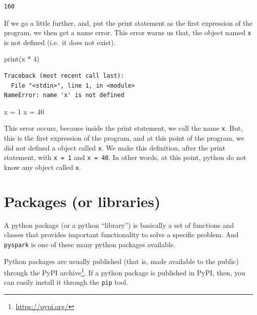 \documentclass[
  11pt,
  letterpaper,
  DIV=11,
  numbers=noendperiod]{scrreprt}
\newenvironment{Shaded}{\begin{snugshade}}{\end{snugshade}}
\newcommand{\BuiltInTok}[1]{\textcolor[rgb]{0.00,0.23,0.31}{#1}}
\newcommand{\DecValTok}[1]{\textcolor[rgb]{0.68,0.00,0.00}{#1}}
\newcommand{\NormalTok}[1]{\textcolor[rgb]{0.00,0.23,0.31}{#1}}
\newcommand{\OperatorTok}[1]{\textcolor[rgb]{0.37,0.37,0.37}{#1}}
\begin{document}
\begin{verbatim}
160
\end{verbatim}

If we go a little further, and, put the print statement as the first
expression of the program, we then get a name error. This error warns us
that, the object named \texttt{x} is not defined (i.e.~it does not
exist).

\begin{Shaded}
\begin{Highlighting}[]
\BuiltInTok{print}\NormalTok{(x }\OperatorTok{*} \DecValTok{4}\NormalTok{)}
\end{Highlighting}
\end{Shaded}

\begin{verbatim}
Traceback (most recent call last):
  File "<stdin>", line 1, in <module>
NameError: name 'x' is not defined
\end{verbatim}

\begin{Shaded}
\begin{Highlighting}[]
\NormalTok{x }\OperatorTok{=} \DecValTok{1}
\NormalTok{x }\OperatorTok{=} \DecValTok{40}
\end{Highlighting}
\end{Shaded}

This error occurs, because inside the print statement, we call the name
\texttt{x}. But, this is the first expression of the program, and at
this point of the program, we did not defined a object called
\texttt{x}. We make this definition, after the print statement, with
\texttt{x\ =\ 1} and \texttt{x\ =\ 40}. In other words, at this point,
python do not know any object called \texttt{x}.

\hypertarget{packages-or-libraries}{%
\section{Packages (or libraries)}\label{packages-or-libraries}}

A python package (or a python ``library'') is basically a set of
functions and classes that provides important functionality to solve a
specific problem. And \texttt{pyspark} is one of these many python
packages available.

Python packages are usually published (that is, made available to the
public) through the PyPI archive\footnote{\url{https://pypi.org/}}. If a
python package is published in PyPI, then, you can easily install it
through the \texttt{pip} tool.
\end{document}
